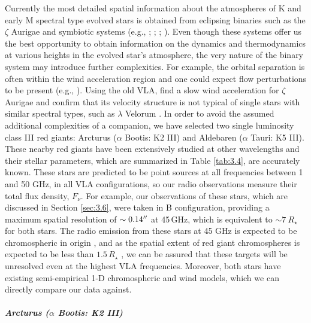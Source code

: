 Currently the most detailed spatial information about the atmospheres of K and early M spectral type evolved stars is obtained from eclipsing binaries such as the $\zeta$ Aurigae and symbiotic systems (e.g., \citealt{wright_1970}; \citealt{baade_1996}; \citealt{eaton_2008}; \citealt{crowley_2008}). Even though these systems offer us the best opportunity to obtain information on the dynamics and thermodynamics at various heights in the evolved star's atmosphere, the very nature of the binary system may introduce further complexities. For example, the orbital separation is often within the wind acceleration region and one could expect flow perturbations to be present (e.g., \citealt{chapman_1981}). 
Using the old VLA, \cite{harper_2005} find a slow wind acceleration for $\zeta$ Aurigae and confirm that its velocity structure is not typical of single stars with similar spectral types, such as $\lambda$ Velorum \citep{carpenter_1999}.   In order to avoid the assumed additional complexities of a companion, we have selected two single luminosity class III red giants: Arcturus ($\alpha$ Bootis: K2 III) and Aldebaren ($\alpha$ Tauri: K5 III). These nearby red giants have been extensively studied at other wavelengths and their stellar parameters, which are summarized in Table \ref{tab:3.4}, are accurately known. These stars are predicted to be point sources at all frequencies between 1 and 50 GHz, in all VLA configurations, so our radio observations measure their total flux density, $F_{\nu}$. For example, our observations of these stars, which are discussed in Section \ref{sec:3.6}, were taken in B configuration, providing a maximum spatial resolution of $\sim 0.14 ^{\prime\prime}$ at 45\,GHz, which is equivalent to $\sim 7\ R_{\star}$ for both stars. The radio emission from these stars at 45 GHz is expected to be chromospheric in origin \citep{harper_2013}, and as the spatial extent of red giant chromospheres is expected to be less than $1.5\,R_{\star}$ \citep{berio_2011}, we can be assured that these targets will be unresolved even at the highest VLA frequencies. Moreover, both stars have existing semi-empirical 1-D chromospheric and wind models, which we can directly compare our data against.
\\
\\
\textbf{\textit{Arcturus ($\alpha$ Bootis: K2 III)}}\\
